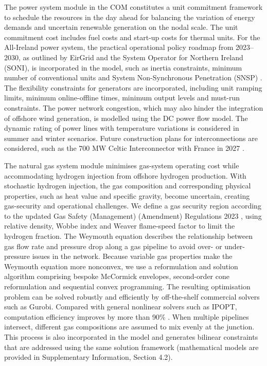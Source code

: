 \documentclass[pdflatex,sn-mathphys,Numbered]{sn-jnl}%
\begin{document}
The power system module in the COM constitutes a unit commitment framework to schedule the resources in the day ahead for balancing the variation of energy demands and uncertain renewable generation on the nodal scale. The unit commitment cost includes fuel costs and start-up costs for thermal units. For the All-Ireland power system, the practical operational policy roadmap from 2023--2030, as outlined by EirGrid and the System Operator for Northern Ireland (SONI), is incorporated in the model, such as inertia constraints, minimum number of conventional units and System Non-Synchronous Penetration (SNSP) \cite{OperationalPolicyRoadmap}.
The flexibility constraints for generators are incorporated, including unit ramping limits, minimum online-offline times, minimum output levels and must-run constraints.
The power network congestion, which may also hinder the integration of offshore wind generation, is modelled using the DC power flow model. The dynamic rating of power lines with temperature variations is considered in summer and winter scenarios.
Future construction plans for interconnections are considered, such as the 700 MW Celtic Interconnector with France in 2027 \cite{CelticInterconnector}.

The natural gas system module minimises gas-system operating cost while accommodating hydrogen injection from offshore hydrogen production. With stochastic hydrogen injection, the gas composition and corresponding physical properties, such as heat value and specific gravity, become uncertain, creating gas-security and operational challenges. We define a gas security region according to the updated Gas Safety (Management) (Amendment) Regulations 2023 \cite{TheGasSafety2023}, using relative density, Wobbe index and Weaver flame-speed factor to limit the hydrogen fraction. The Weymouth equation describes the relationship between gas flow rate and pressure drop along a gas pipeline to avoid over- or under-pressure issues in the network. Because variable gas properties make the Weymouth equation more nonconvex, we use a reformulation and solution algorithm comprising bespoke McCormick envelopes, second-order cone reformulation and sequential convex programming. The resulting optimisation problem can be solved robustly and efficiently by off-the-shelf commercial solvers such as Gurobi. Compared with general nonlinear solvers such as IPOPT, computation efficiency improves by more than 90\% \cite{wang2023optimal}.
When multiple pipelines intersect, different gas compositions are assumed to mix evenly at the junction. This process is also incorporated in the model and generates bilinear constraints that are addressed using the same solution framework (mathematical models are provided in Supplementary Information, Section 4.2).
\end{document}
